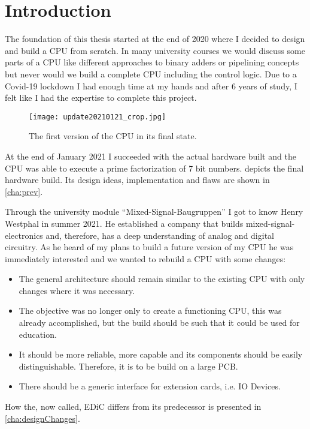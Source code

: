\chapter{Introduction} \label{cha:intro}
The foundation of this thesis started at the end of 2020 where I decided to design and build a \gls{CPU} from scratch.
In many university courses we would discuss some parts of a \gls{CPU} like different approaches to binary adders or pipelining concepts but never would we build a complete \gls{CPU} including the control logic.
Due to a Covid-19 lockdown I had enough time at my hands and after 6 years of study, I felt like I had the expertise to complete this project.

\begin{figure}[t]
  \centering
  \texttt{[image: update20210121\_crop.jpg]}
  \caption{The first version of the \gls{CPU} in its final state.}
  \label{fig:initialCPU}
\end{figure}
At the end of January 2021 I succeeded with the actual hardware built and the \gls{CPU} was able to execute a prime factorization of 7 bit numbers.
 depicts the final hardware build.
Its design ideas, implementation and flaws are shown in \cref{cha:prev}.

Through the university module ``Mixed-Signal-Baugruppen'' I got to know Henry Westphal in summer 2021.
He established a company that builds mixed-signal-electronics and, therefore, has a deep understanding of analog and digital circuitry.
As he heard of my plans to build a future version of my \gls{CPU} he was immediately interested and we wanted to rebuild a \gls{CPU} with some changes:
\begin{itemize}
  \item The general architecture should remain similar to the existing \gls{CPU} with only changes where it was necessary.
  \item The objective was no longer only to create a functioning \gls{CPU}, this was already accomplished, but the build should be such that it could be used for education.
  \item It should be more reliable, more capable and its components should be easily distinguishable. Therefore, it is to be build on a large \gls{PCB}.
  \item There should be a generic interface for extension cards, i.e. IO Devices.
\end{itemize}
How the, now called, \gls{EDiC} differs from its predecessor is presented in \cref{cha:designChanges}.

